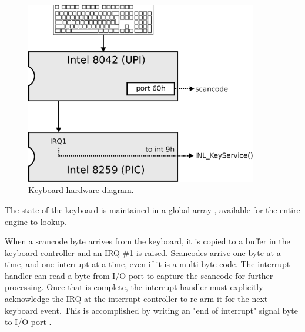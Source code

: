 \documentclass[book.tex]{subfiles}
\begin{document}
\par
\begin{figure}[H]
  \centering
  \includegraphics[width=0.9\textwidth]{imgs/drawings/keyboard.eps}
  \caption{Keyboard hardware diagram.}
  \label{fig:pc_keyboard}
\end{figure}

\par
\begin{minipage}{\textwidth}

\end{minipage}

\par
The state of the keyboard is maintained in a global array , available for the entire engine to lookup.\\
\par
\begin{minipage}{\textwidth}

\end{minipage}

\par
When a scancode byte arrives from the keyboard, it is copied to a buffer in the keyboard controller and an IRQ \#1 is raised. Scancodes arrive one byte at a time, and one interrupt at a time, even if it is a multi-byte code. The interrupt handler can read a byte from I/O port  to capture the scancode for further processing. Once that is complete, the interrupt handler must explicitly acknowledge the IRQ at the interrupt controller to re-arm it for the next keyboard event. This is accomplished by writing an "end of interrupt" signal byte to I/O port . \\
\end{document}
